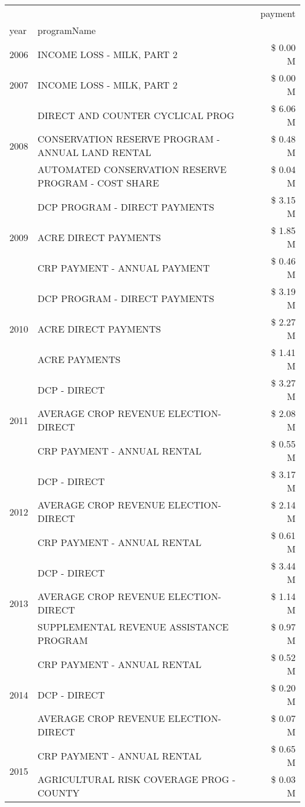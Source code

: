 \begin{tabular}{llr}
\toprule
 &  & payment \\
year & programName &  \\
\midrule
2006 & INCOME LOSS - MILK, PART 2 & \$ 0.00 M \\
\cline{1-3}
2007 & INCOME LOSS - MILK, PART 2 & \$ 0.00 M \\
\cline{1-3}
\multirow[t]{3}{*}{2008} & DIRECT AND COUNTER CYCLICAL PROG & \$ 6.06 M \\
 & CONSERVATION RESERVE PROGRAM - ANNUAL LAND RENTAL & \$ 0.48 M \\
 & AUTOMATED CONSERVATION RESERVE PROGRAM - COST SHARE & \$ 0.04 M \\
\cline{1-3}
\multirow[t]{3}{*}{2009} & DCP PROGRAM - DIRECT PAYMENTS & \$ 3.15 M \\
 & ACRE DIRECT PAYMENTS & \$ 1.85 M \\
 & CRP PAYMENT - ANNUAL PAYMENT & \$ 0.46 M \\
\cline{1-3}
\multirow[t]{3}{*}{2010} & DCP PROGRAM - DIRECT PAYMENTS & \$ 3.19 M \\
 & ACRE DIRECT PAYMENTS & \$ 2.27 M \\
 & ACRE PAYMENTS & \$ 1.41 M \\
\cline{1-3}
\multirow[t]{3}{*}{2011} & DCP - DIRECT & \$ 3.27 M \\
 & AVERAGE CROP REVENUE ELECTION-DIRECT & \$ 2.08 M \\
 & CRP PAYMENT - ANNUAL RENTAL & \$ 0.55 M \\
\cline{1-3}
\multirow[t]{3}{*}{2012} & DCP - DIRECT & \$ 3.17 M \\
 & AVERAGE CROP REVENUE ELECTION-DIRECT & \$ 2.14 M \\
 & CRP PAYMENT - ANNUAL RENTAL & \$ 0.61 M \\
\cline{1-3}
\multirow[t]{3}{*}{2013} & DCP - DIRECT & \$ 3.44 M \\
 & AVERAGE CROP REVENUE ELECTION-DIRECT & \$ 1.14 M \\
 & SUPPLEMENTAL REVENUE ASSISTANCE PROGRAM & \$ 0.97 M \\
\cline{1-3}
\multirow[t]{3}{*}{2014} & CRP PAYMENT - ANNUAL RENTAL & \$ 0.52 M \\
 & DCP - DIRECT & \$ 0.20 M \\
 & AVERAGE CROP REVENUE ELECTION-DIRECT & \$ 0.07 M \\
\cline{1-3}
\multirow[t]{3}{*}{2015} & CRP PAYMENT - ANNUAL RENTAL & \$ 0.65 M \\
 & AGRICULTURAL RISK COVERAGE PROG - COUNTY & \$ 0.03 M \\

\end{tabular}
